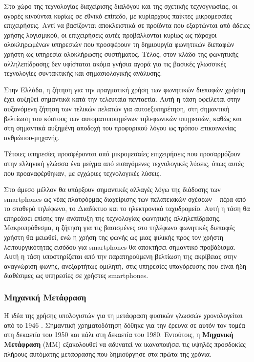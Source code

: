 \begin{multicols}{2}
Στο χώρο της τεχνολογίας διαχείρισης διαλόγου και της σχετικής τεχνογνωσίας, οι αγορές κινούνται κυρίως σε εθνικό επίπεδο, με κυρίαρχους παίκτες μικρομεσαίες επιχειρήσεις. Αντί να βασίζονται αποκλειστικά σε προϊόντα που εξαρτώνται από άδειες χρήσης λογισμικού, οι επιχειρήσεις αυτές προβάλλονται κυρίως ως πάροχοι ολοκληρωμένων υπηρεσιών που προσφέρουν τη δημιουργία φωνητικών διεπαφών χρήστη ως υπηρεσία ολοκλήρωσης συστήματος. Τέλος, στον κλάδο της φωνητικής αλληλεπίδρασης δεν υφίσταται ακόμα γνήσια αγορά για τις βασικές γλωσσικές τεχνολογίες συντακτικής και σημασιολογικής ανάλυσης.

Στην Ελλάδα, η ζήτηση για την πραγματική χρήση των φωνητικών διεπαφών χρήστη έχει αυξηθεί σημαντικά κατά την τελευταία πενταετία. Αυτή η τάση οφείλεται στην αυξανόμενη ζήτηση των τελικών πελατών για αυτοεξυπηρέτηση, στη σημαντική βελτίωση του κόστους των αυτοματοποιημένων τηλεφωνικών υπηρεσιών, καθώς και στη σημαντικά αυξημένη αποδοχή του προφορικού λόγου ως τρόπου επικοινωνίας  ανθρώπου-μηχανής.

Τέτοιες υπηρεσίες προσφέρονται από μικρομεσαίες επιχειρήσεις που προσαρμόζουν στην ελληνική γλώσσα ένα μείγμα από εισαγόμενες τεχνολογικές λύσεις, όπως αυτές που προαναφέρθηκαν, με εγχώριες τεχνολογικές λύσεις.

Στο άμεσο μέλλον θα υπάρξουν σημαντικές αλλαγές λόγω της διάδοσης των smartphones ως νέας πλατφόρμας διαχείρισης των πελατειακών σχέσεων – πέρα από το σταθερό τηλέφωνο, το Διαδίκτυο και το ηλεκτρονικό ταχυδρομείο. Αυτή η τάση θα επηρεάσει επίσης την ανάπτυξη της τεχνολογίας φωνητικής αλληλεπίδρασης. Μακροπρόθεσμα, η ζήτηση για τις βασισμένες στο τηλέφωνο φωνητικές διεπαφές χρήστη θα μειωθεί, ενώ η χρήση της φωνής ως μιας φιλικής προς τον χρήστη λειτουργικότητας εισόδου για smartphones θα αποκτήσει σημαντικό προβάδισμα. Αυτή η τάση υποστηρίζεται από την παρατηρούμενη βελτίωση της ακρίβειας στην αναγνώριση φωνής, ανεξαρτήτως ομιλητή, στις υπηρεσίες υπαγόρευσης που είναι ήδη διαθέσιμες ως υπηρεσίες σε χρήστες smartphones.

\subsubsection{Μηχανική Μετάφραση}

Η ιδέα της χρήσης υπολογιστών για τη μετάφραση φυσικών γλωσσών χρονολογείται από το 1946 . Σημαντική χρηματοδότηση δόθηκε για την έρευνα σε αυτόν τον τομέα στη δεκαετία του 1950 και πάλι στη δεκαετία του 1980. Εντούτοις, η \textbf{Μηχανική Μετάφραση} (ΜΜ) εξακολουθεί να αδυνατεί να ικανοποιήσει τις υψηλές προσδοκίες πλήρους αυτόματης μετάφρασης που δημιούργησε στα πρώτα της χρόνια.


\end{multicols}
